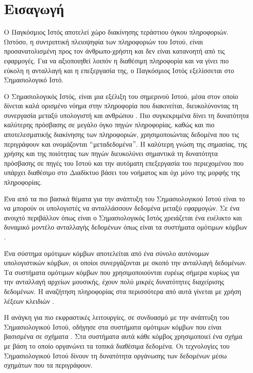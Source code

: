 \chapter{Εισαγωγή}
Ο Παγκόσμιος Ιστός αποτελεί χώρο διακίνησης τεράστιου όγκου
πληροφοριών. Ωστόσο, η συντριπτική πλειοψηφία των πληροφοριών του
Ιστού, είναι προσανατολισμένη προς τον άνθρωπο-χρήστη και δεν
είναι κατανοητή από τις εφαρμογές. Για να αξιοποιηθεί λοιπόν η
διαθέσιμη πληροφορία και να γίνει πιο εύκολη η ανταλλαγή και η
επεξεργασία της, ο Παγκόσμιος Ιστός εξελίσσεται στο Σημασιολογικό
Ιστό.

Ο Σημασιολογικός Ιστός, είναι μια εξέλιξη του σημερινού Ιστού,
μέσα στον οποίο δίνεται καλά ορισμένο νόημα στην πληροφορία που
διακινείται, διευκολύνοντας τη συνεργασία μεταξύ υπολογιστή και
ανθρώπου \cite{Berners-Lee01}. Πιο συγκεκριμένα δίνει τη
δυνατότητα καλύτερης πρόσβασης σε μεγάλο όγκο πηγών πληροφορίας,
καθώς και πιο αποτελεσματικής διακίνησης των πληροφοριών,
χρησιμοποιώντας δεδομένα που τις περιγράφουν και ονομάζονται
$``$μεταδεδομένα$"$. Η καλύτερη γνώση της σημασίας, της χρήσης και
της ποιότητας των πηγών διευκολύνει σημαντικά τη δυνατότητα
πρόσβασης σε πηγές του Ιστού και την αυτόματη επεξεργασία του
περιεχομένου που υπάρχει διαθέσιμο στο Διαδίκτυο βάσει του
νοήματος και όχι μόνο της μορφής της πληροφορίας.

Ένα από τα πιο βασικά θέματα για την ανάπτυξη του Σημασιολογικού
Ιστού είναι το να μπορούν οι υπολογιστές να ανταλλάσσουν δεδομένα
 μεταξύ εφαρμογών. Σε ένα ανοιχτό περιβάλλον όπως
είναι ο Σημασιολογικός Ιστός χρειάζεται ένα ευέλικτο και δυναμικό
μοντέλο ανταλλαγής δεδομένων όπως είναι τα συστήματα ομότιμων
κόμβων .

Ένα σύστημα ομότιμων κόμβων αποτελείται από ένα σύνολο αυτόνομων
υπολογιστικών κόμβων, οι οποίοι συνεργάζονται με σκοπό την
ανταλλαγή δεδομένων. Τα συστήματα ομότιμων κόμβων που
χρησιμοποιούνται ευρέως σήμερα κυρίως για την ανταλλαγή αρχείων
μουσικής, έχουν πολύ μικρές δυνατότητες διαχείρισης δεδομένων. Η
αναζήτηση πληροφορίας στα περισσότερα από αυτά γίνεται με χρήση
λέξεων κλειδιών .

Η ανάγκη για πιο εκφραστικές λειτουργίες, σε συνδυασμό με την
ανάπτυξη του Σημασιολογικού Ιστού, οδήγησε στα συστήματα ομότιμων
κόμβων που είναι βασισμένα σε σχήματα . Στα συστήματα αυτά κάθε κόμβος
χρησιμοποιεί ένα σχήμα με βάση το οποίο οργανώνει τα τοπικά
διαθέσιμα δεδομένα. Οι τεχνολογίες του Σημασιολογικού Ιστού δίνουν
τη δυνατότητα οργάνωσης των δεδομένων μέσω σχημάτων που τα
περιγράφουν.
 
